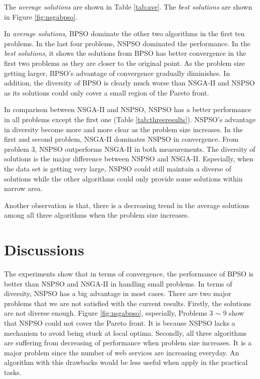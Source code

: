 The \emph{average solutions} are shown in Table \ref{tab:ave}. The \emph{best solutions} are shown in Figure \ref{fig:nsgabpso}.

In \emph{average solutions}, BPSO dominate the other two algorithms in the first ten problems. In the last four problems, 
NSPSO dominated the performance. 
In the \emph{best solutions}, 
it shows the solutions from BPSO has better convergence in the first two problems as they are closer to the original point. As the problem size getting larger,
BPSO's advantage of convergence gradually diminishes. 
In addition, the diversity of BPSO is clearly much worse than NSGA-II and NSPSO as its solutions could 
only cover a small region of the Pareto front.

In comparison between NSGA-II and NSPSO, NSPSO has a better performance in all problems except the first one (Table \ref{tab:threeresults}). NSPSO's advantage in diversity become more and more clear as the problem size increases.
In the first and second problem, NSGA-II dominates NSPSO in convergence. From problem 3, NSPSO outperforms
NSGA-II in both measurements. The diversity of solutions is the major difference between NSPSO and NSGA-II. 
Especially, when the data set is getting very large, NSPSO could still maintain a diverse of solutions while 
the other algorithms could only provide some solutions within narrow area.

Another observation is that, there is a decreasing trend in the average solutions among all three algorithms when the problem size increases.

\section{Discussions}
The experiments show that in terms of convergence, 
the performance of BPSO is better than NSPSO and NSGA-II in handling small problems. 
In terms of diversity, NSPSO has a big advantage in most cases.
There are two major problems that we are not satisfied with the current results.
Firstly, the solutions are not diverse enough. Figure \ref{fig:nsgabpso}, especially, Problems 3 $\sim$ 9 show that NSPSO could not cover the Pareto front.
It is because NSPSO lacks a mechanism to avoid being stuck at local optima.
Secondly, all three algorithms are suffering from decreasing of performance when problem size increases. 
It is a major problem since the number of web services are increasing everyday.
An algorithm with this drawbacks would be less useful when apply in the practical tasks.


